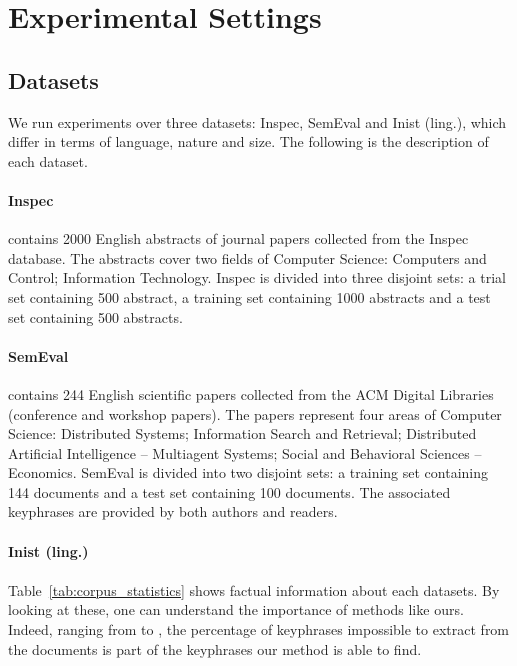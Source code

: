 \section{Experimental Settings}
\label{sec:experimental_settings}
  \subsection{Datasets}
  \label{subsec:datasets}
    We run experiments over three datasets: Inspec, SemEval and Inist (ling.),
    which differ in terms of language, nature and size. The following is the
    description of each dataset.

    \paragraph{Inspec~\textnormal{\cite{hulth2003keywordextraction}}} contains
    2000 English abstracts of journal papers collected from the Inspec database.
    The abstracts cover two fields of Computer Science: Computers and Control;
    Information Technology. Inspec is divided into three disjoint sets: a trial
    set containing 500 abstract, a training set containing 1000 abstracts and a
    test set containing 500 abstracts. 

    \paragraph{SemEval~\textnormal{\cite{kim2010semeval}}} contains 244 English
    scientific papers collected from the ACM Digital Libraries (conference and
    workshop papers). The papers represent four areas of Computer Science:
    Distributed Systems; Information Search and Retrieval; Distributed
    Artificial Intelligence -- Multiagent Systems; Social and Behavioral
    Sciences -- Economics. SemEval is divided into two disjoint sets: a training
    set containing 144 documents and a test set containing 100 documents. The
    associated keyphrases are provided by both authors and readers.

    \paragraph{Inist (ling.)} 

    \paragraph{}
    Table~\ref{tab:corpus_statistics} shows factual information about each
    datasets. By looking at these, one can understand the importance of methods
    like ours. Indeed, ranging from  to , the percentage
    of keyphrases impossible to extract from the documents is part of the
    keyphrases our method is able to find.

